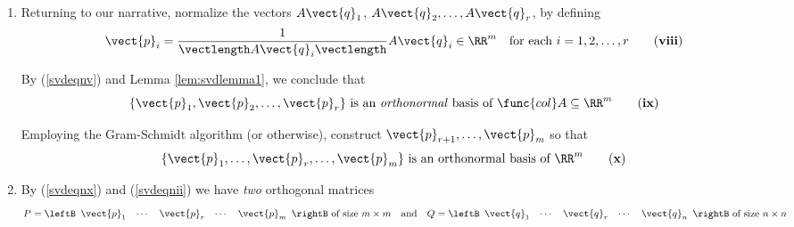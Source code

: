 \begin{enumerate}[label=\textbf{\arabic*.},leftmargin=*]
\noindent With (\ref{svdeqnvi}) this makes the following definitions depend
only upon $A$. 

\begin{definition}{}{svddef2}
Let $A$ be a real, $m\times n$ matrix of rank $r$, with positive singular
values $\sigma_{1}\geq \sigma_{2}\geq \cdots \geq \sigma_{r}>0$ and $\sigma_{i}=0$ if $i>r$. Define:

\begin{equation*}
D_{A}=\func{diag}(\sigma_{1},\ldots ,\sigma_{r})\quad
\qquad \mbox{and}\quad \qquad \Sigma_{A}=
\leftB 
\begin{array}{cc}
D_{A} & 0 \\ 
0 & 0
\end{array}
\rightB_{m\times n}
\end{equation*}

\noindent Here $\Sigma_{A}$ is in block form and is called the \textbf{singular matrix} of $A$.
\end{definition}

\noindent The singular values $\sigma_{i}$ and the matrices $D_{A}$ and $\Sigma_{A}$ will be referred to frequently below.

\noindent \item Returning to our narrative, normalize the vectors $A\vect{q}_{1}$, $A\vect{q}_{2},\ldots, A\vect{q}_{r}$, by defining
\begin{equation}\label{svdeqnviii}
\vect{p}_{i}=\frac{1}{\vectlength A\vect{q}_{i}\vectlength }A\vect{q}_{i}\in \RR^{m} \quad \mbox{for each }
i=1,2,\ldots ,r \tag{\textbf{viii}}
\end{equation}

\noindent By (\ref{svdeqnv}) and Lemma \ref{lem:svdlemma1}, we conclude that
\begin{equation}\label{svdeqnix}
\{\vect{p}_{1},\vect{p}_{2},\ldots ,\vect{p}_{r}\} \mbox{ is an \emph{orthonormal} basis of } \func{col}A\subseteq \RR^{m}  \tag{\textbf{ix}}
\end{equation}

\noindent Employing the Gram-Schmidt algorithm (or otherwise), construct $\vect{p}_{r+1},\ldots ,\vect{p}_{m}$ so that
\begin{equation}\label{svdeqnx}
\{\vect{p}_{1},\ldots ,\vect{p}_{r},\ldots ,\vect{p}_{m}\} \mbox{ is an orthonormal basis of } \RR^{m} \tag{\textbf{x}}
\end{equation}

\item By (\ref{svdeqnx}) and (\ref{svdeqnii}) we have \emph{two}
orthogonal matrices
\begin{equation*}
P=\leftB \begin{array}{ccccc} \vect{p}_{1} & \cdots & \vect{p}_{r} & \cdots & \vect{p}_{m} \end{array}\rightB \mbox{ of size } m\times m \quad \mbox{and} \quad Q=\leftB \begin{array}{ccccc} \vect{q}_{1} & \cdots & \vect{q}_{r} & \cdots & \vect{q}_{n}\end{array}\rightB \mbox{ of size } n\times n
\end{equation*}


\end{enumerate}
